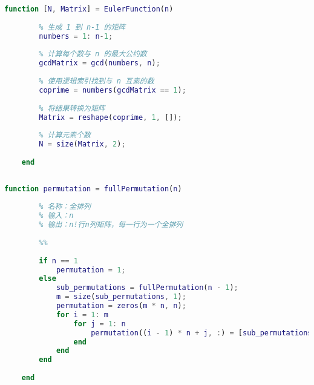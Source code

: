 \begin{lstlisting}[language=Matlab, caption={Euler函数}, label={EulerFunction}]
	function [N, Matrix] = EulerFunction(n)
	
	    % 生成 1 到 n-1 的矩阵
	    numbers = 1: n-1;
	    
	    % 计算每个数与 n 的最大公约数
	    gcdMatrix = gcd(numbers, n);
	    
	    % 使用逻辑索引找到与 n 互素的数
	    coprime = numbers(gcdMatrix == 1);
	    
	    % 将结果转换为矩阵
	    Matrix = reshape(coprime, 1, []);
	
	    % 计算元素个数
	    N = size(Matrix, 2);
	
	end
	
\end{lstlisting}

\begin{lstlisting}[language=Matlab, caption={全排列}, label={fullPermutation}]
	function permutation = fullPermutation(n)
	
	    % 名称：全排列
	    % 输入：n
	    % 输出：n!行n列矩阵，每一行为一个全排列
	
	    %%
	
	    if n == 1
	        permutation = 1;
	    else
	        sub_permutations = fullPermutation(n - 1);
	        m = size(sub_permutations, 1);
	        permutation = zeros(m * n, n);
	        for i = 1: m
	            for j = 1: n
	                permutation((i - 1) * n + j, :) = [sub_permutations(i, 1:j-1), n, sub_permutations(i, j:end)];
	            end
	        end
	    end
	
	end
	
\end{lstlisting}

